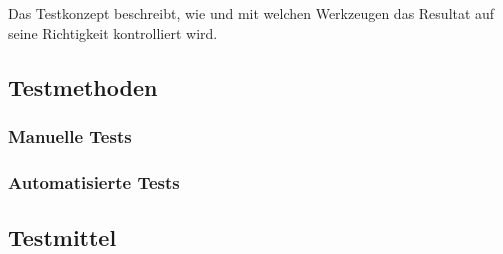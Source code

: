 Das Testkonzept beschreibt, wie und mit welchen Werkzeugen das Resultat auf seine Richtigkeit kontrolliert wird.

\subsection{Testmethoden}

\subsubsection{Manuelle Tests}

\subsubsection{Automatisierte Tests}

\subsection{Testmittel}
